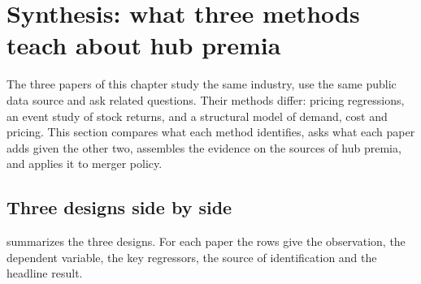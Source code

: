 \section{Synthesis: what three methods teach about hub premia}\label{sec:09-synthesis}

The three papers of this chapter study the same industry, use the same public data source and ask related
questions. Their methods differ: pricing regressions, an event study of stock returns, and a structural model
of demand, cost and pricing. This section compares what each method identifies, asks what each paper adds
given the other two, assembles the evidence on the sources of hub premia, and applies it to merger policy.

\subsection{Three designs side by side}\label{sec:09-synthesis-designs}

 summarizes the three designs. For each paper the rows give the observation, the
dependent variable, the key regressors, the source of identification and the headline result.

